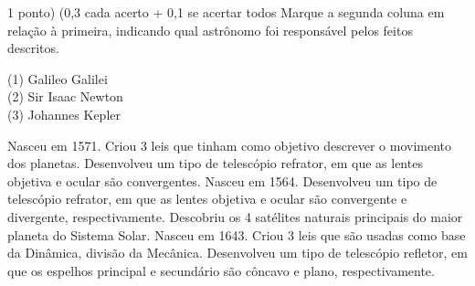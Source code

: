 \documentclass{../lista}
\begin{document}
	\begin{questao}{1 ponto) (0,3 cada acerto + 0,1 se acertar todos}
		Marque a segunda coluna em relação à primeira, indicando qual astrônomo foi responsável pelos feitos descritos.
		\begin{multicols}{2}
			\vfill\null \vfill\null
			\begin{flushleft}
				(1) Galileo Galilei \\
				(2) Sir Isaac Newton \\
				(3) Johannes Kepler
			\end{flushleft}
			\vfill\null \vfill\null
			\columnbreak
			\begin{alternativas}
				\alternativaMarcada[$\red{3}$] Nasceu em 1571. Criou 3 leis que tinham como objetivo descrever o movimento dos planetas. Desenvolveu um tipo de telescópio refrator, em que as lentes objetiva e ocular são convergentes.
				\alternativaMarcada[$\red{1}$] Nasceu em 1564. Desenvolveu um tipo de telescópio refrator, em que as lentes objetiva e ocular são convergente e divergente, respectivamente. Descobriu os 4 satélites naturais principais do maior planeta do Sistema Solar.
				\alternativaMarcada[$\red{2}$] Nasceu em 1643. Criou 3 leis que são usadas como base da Dinâmica, divisão da Mecânica. Desenvolveu um tipo de telescópio refletor, em que os espelhos principal e secundário são côncavo e plano, respectivamente.
			\end{alternativas}
		\end{multicols}
	\end{questao}
\end{document}
